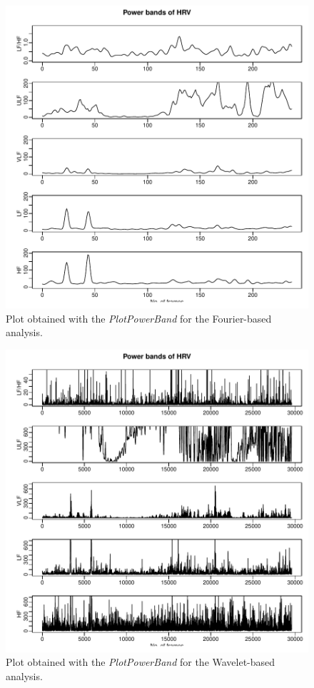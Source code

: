 \documentclass[12pt,lot, lof]{puthesis}
\begin{document}
\begin{figure}[h]
\centering
\includegraphics{figures/tutorial-plottingFreqFourier}
\caption{Plot obtained with the \textit{PlotPowerBand} for the Fourier-based 
analysis.\label{fig:examplePlotFourier}}
\end{figure}
\begin{figure}[h]
\centering
\includegraphics{figures/tutorial-plottingFreqWavelet}
\caption{Plot obtained with the \textit{PlotPowerBand} for the Wavelet-based 
analysis.\label{fig:examplePlotWave}}
\end{figure}
\end{document}
